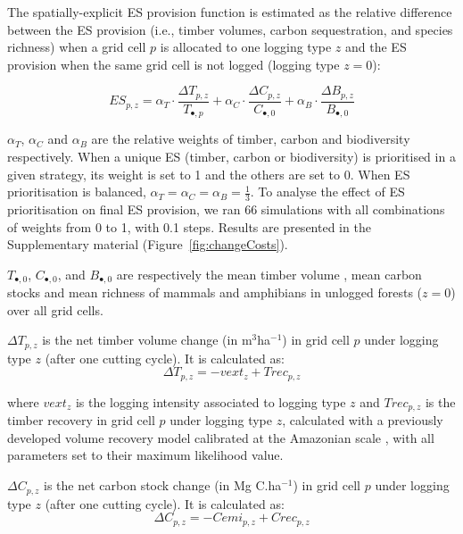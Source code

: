 \documentclass[12pt]{article}
\begin{document}
The spatially-explicit ES provision function is estimated as the relative difference between the ES provision (i.e., timber volumes, carbon sequestration, and species richness) when a grid cell $p$ is allocated to one logging type $z$ and the ES provision when the same grid cell is not logged (logging type $z=0$): 

\begin{equation}
ES_{p,z} = \alpha _T \cdot \frac{\Delta T_{p,z}}{ T_{\bullet,p}} + \alpha _C \cdot \frac{\Delta C_{p,z}}{C_{\bullet,0}} + \alpha _B \cdot \frac{\Delta B_{p,z}}{B_{\bullet,0}} 
\end{equation}

$\alpha_T$, $\alpha_C$ and $\alpha_B$ are the relative weights of timber, carbon and biodiversity respectively. When a unique ES (timber, carbon or biodiversity) is prioritised in a given strategy, its weight is set to 1 and the others are set to 0. When ES prioritisation is balanced, $\alpha_T = \alpha_C = \alpha_B = \frac{1}{3}$.
To analyse the effect of ES prioritisation on final ES provision, we ran 66 simulations with all combinations of weights from 0 to 1, with 0.1 steps. Results are presented in the Supplementary material (Figure~\ref{fig:changeCosts}). 

$T_{\bullet,0}$, $C_{\bullet,0}$, and $B_{\bullet,0}$ are respectively the mean timber volume \cite{Piponiot2019}, mean carbon stocks \cite{Avitabile2016} and mean richness of mammals and amphibians \cite{Jenkins2013} in unlogged forests ($z=0$) over all grid cells. 

$\Delta T_{p,z}$ is the net timber volume change (in m$^3$ha$^{-1}$) in grid cell $p$ under logging type $z$ (after one cutting cycle). It is calculated as: 
\begin{equation}
\Delta T_{p,z} = - vext_{z} + Trec_{p,z}
\end{equation} 

where $vext_z$ is the logging intensity associated to logging type $z$ and $Trec_{p,z}$ is the timber recovery in grid cell $p$ under logging type $z$, calculated with a previously developed volume recovery model calibrated at the Amazonian scale \cite{Piponiot2019}, with all parameters set to their maximum likelihood value. 

$\Delta C_{p,z}$ is the net carbon stock change (in Mg C.ha$^{-1}$) in grid cell $p$ under logging type $z$ (after one cutting cycle). It is calculated as: 
\begin{equation}
\Delta C_{p,z} = - Cemi_{p,z} + Crec_{p,z}
\end{equation} 
\end{document}

